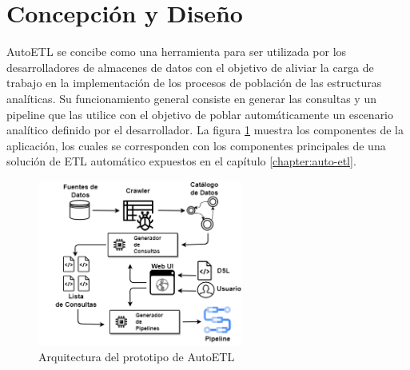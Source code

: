 \section{Concepción y Diseño}\label{section:design}

AutoETL se concibe como una herramienta para ser utilizada por los desarrolladores de almacenes de datos 
con el objetivo de aliviar la carga de trabajo en la implementación de los procesos de población de las 
estructuras analíticas. Su funcionamiento general consiste en generar las consultas y un pipeline que las utilice 
con el objetivo de poblar automáticamente un escenario analítico definido por el desarrollador. La 
figura \ref{fig:arquitectura} muestra los componentes de la aplicación, los cuales se corresponden 
con los componentes principales de una soluci\'on de ETL automático expuestos en el cap\'itulo \ref{chapter:auto-etl}.

\begin{figure}[H]
    \centering
    \includegraphics[width=0.60\textwidth]{Graphics/arch.drawio.png}
    \caption{Arquitectura del prototipo de AutoETL}
    \label{fig:arquitectura}
    \end{figure}




